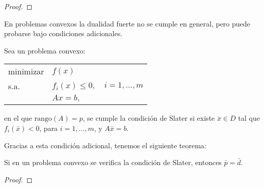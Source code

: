 \begin{proof}
\end{proof}

En problemas convexos la dualidad fuerte no se cumple en general, pero puede probarse bajo condiciones adicionales.

\begin{defn}

Sea un problema convexo:

\begin{tabular}{lll}
minimizar & $f(x)$ & \\
s.a. & $f_i(x)\leq 0,$  &  $i=1,\ldots,m$ \\
	 & $Ax=b,$  &  
\end{tabular}

en el que $\mbox{rango}(A)=p$, se cumple la condición de Slater si existe $\bar{x}\in D$  tal que $f_i(\bar{x})<0$, para $i=1,\ldots,m$, y $A\bar{x}=b$. 
\end{defn}

Gracias a esta condición adicional, tenemos el siguiente teorema:

\begin{theorem}
Si en un problema convexo se verifica la condición de Slater, entonces $\bar{p} =  \bar{d}$.
\end{theorem}

\begin{proof}
\end{proof}



